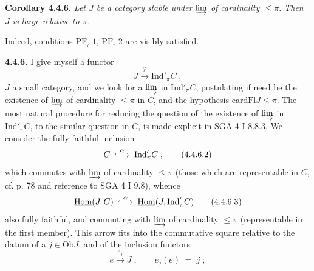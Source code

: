 \documentclass[11pt]{article}
\newcommand{\msp}[1]{\marginpar{\footnotesize [#1]}}
\newcommand{\uHom}{\underline{\mathrm{Hom}}}
\newcommand{\Ind}{\mathrm{Ind}}
\newcommand{\card}{\mathrm{card}}
\newcommand{\Fl}{\mathrm{Fl}}
\newcommand{\Ob}{\mathrm{Ob}}
\newcommand{\hookxrightarrow}[2][]{\lhook\joinrel\xrightarrow[#1]{#2}}
\begin{document}
\textbf{Corollary 4.4.6.} \textit{Let $J$ be a category stable under} $\varinjlim$ \textit{of cardinality $\leqslant \pi$. Then $J$ is large relative to $\pi$.}

Indeed, conditions $\mathrm{PF}_{\pi}\,1$, $\mathrm{PF}_{\pi}\,2$ are visibly satisfied.

\msp{page 83}
\textbf{4.4.6.} I give myself a functor %
\[
J \xrightarrow{\;\varphi\;} \Ind'_\pi C \;, \tag*{(4.4.6.1)}
\]
$J$ a small category, and we look for a $\varinjlim$ in $\Ind'_\pi C$, postulating if need be the existence of $\varinjlim$ of cardinality $\leqslant \pi$ in $C$, and the hypothesis $\card\Fl J \leqslant \pi$. The most natural procedure for reducing the question of the existence of $\varinjlim$ in $\Ind'_\pi C$, to the similar question in $C$, is made explicit in SGA 4 I 8.8.3. We consider the fully faithful inclusion
\[
C \;\hookxrightarrow{\;\alpha\;}\; \Ind'_\pi C \;, \tag*{(4.4.6.2)}
\]
which commutes with $\varinjlim$ of cardinality $\leqslant \pi$ (those which are representable in $C$, cf. p. 78 and reference to SGA 4 I 9.8), whence
\[
\uHom(J,C) \;\hookxrightarrow{\;\alpha\;}\; \uHom(J,\Ind'_\pi C) \tag*{(4.4.6.3)}
\]
also fully faithful, and commuting with $\varinjlim$ of cardinality $\leqslant \pi$ (representable in the first member). This arrow fits into the commutative square relative to the datum of a $j \in \Ob J$, and of the inclusion functors
\[
e \xrightarrow{\;\varepsilon_j\;} J \;, \qquad e_j(e) \;=\; j \;; \tag*{(4.4.6.4)} %
\]
\end{document}
